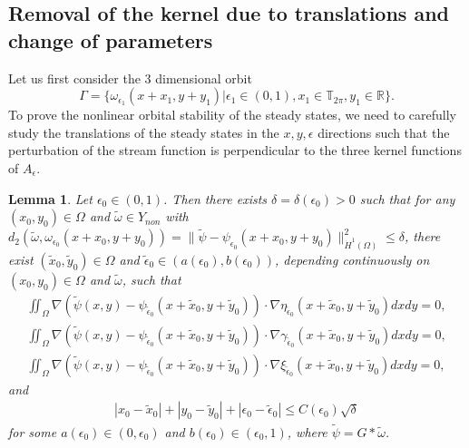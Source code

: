 \documentclass[1 [leqno, 11pt]{amsart}
\numberwithin{equation}{section}
\let\ep=\epsilon
\newtheorem{lemma}[Theorem]{Lemma}
\begin{document}
\begin{CJK*}{GBK}{song}
\subsection{Removal of the kernel due to translations and change of parameters}
Let us first consider the 3 dimensional orbit
$$\Gamma = \{\omega_{\ep_1}(x+x_1, y + y_1)| \ep_1 \in (0, 1), x_1 \in \mathbb{T}_{2\pi}, y_1 \in \mathbb{R} \}.$$
To prove the nonlinear orbital stability of the steady states,  we need to carefully study the translations of the steady states  in the $x, y, \ep$ directions such that the perturbation of the stream function is perpendicular to the three kernel functions of $ A_\ep$.
\begin{lemma}\label{imp-vertical condition} Let $\ep_0\in(0,1)$. Then  there exists $\delta=\delta(\ep_0)>0$ such that for any  $(x_0,y_0)\in\Omega$ and  $\tilde \omega\in Y_{non}$ with $d_2(\tilde \omega,\omega_{\ep_0}(x+x_0,y+y_0))=\|\tilde\psi-\psi_{\ep_0}(x+x_0,y+y_0)\|_{\dot{H}^1(\Omega)}^2\leq \delta$, there exist $(\tilde x_0,\tilde y_0)\in\Omega$ and $\tilde \epsilon_0\in(a(\ep_0),b(\ep_0))$, depending continuously  on $(x_0,y_0)\in\Omega$ and  $\tilde \omega$, such that
\begin{align*}
\iint_{\Omega}\nabla\left(\tilde \psi(x,y)-\psi_{\tilde \ep_0}(x+\tilde x_0,y+\tilde y_0)\right)\cdot\nabla\eta_{\tilde \ep_0}\left(x+\tilde x_0,y+\tilde y_0\right)dxdy=0,\\
\iint_{\Omega}\nabla\left(\tilde \psi(x,y)-\psi_{\tilde \ep_0}(x+\tilde x_0,y+\tilde y_0)\right)\cdot\nabla\gamma_{\tilde \ep_0}\left(x+\tilde x_0,y+\tilde y_0\right)dxdy=0,\\
\iint_{\Omega}\nabla\left(\tilde \psi(x,y)-\psi_{\tilde \ep_0}(x+\tilde x_0,y+\tilde y_0)\right)\cdot\nabla\xi_{\tilde \ep_0}\left(x+\tilde x_0,y+\tilde y_0\right)dxdy=0,
\end{align*}
and
 \begin{align*}
|x_0-\tilde x_0|+|y_0-\tilde y_0|+|\ep_0-\tilde \ep_0|\leq C(\ep_0)\sqrt{\delta}
\end{align*}
for some $a(\ep_0)\in (0,\ep_0)$ and $b(\ep_0)\in(\ep_0,1)$, where $\tilde\psi=G*\tilde\omega$.
\end{lemma}


\end{CJK*}
\end{document}
